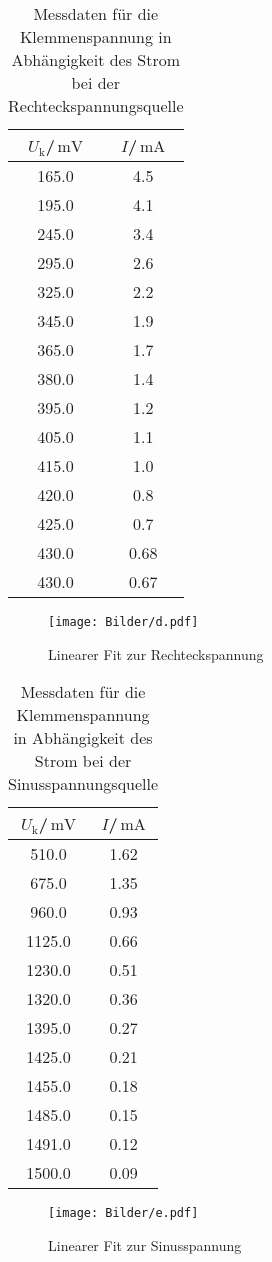 \begin{table}[h]
  \centering
  \caption{Messdaten für die Klemmenspannung in Abhängigkeit des Strom bei der Rechteckspannungsquelle}
  \label{tab:reckteck}
\begin{tabular}{cc}
  \toprule
$U_\text{k}$/$\,\si{\milli\volt}$ & $I$/$\,\si{\milli\ampere}$\\
\midrule
165.0 & 4.5 \\
195.0 & 4.1 \\
245.0 & 3.4 \\
295.0 & 2.6 \\
325.0 & 2.2 \\
345.0 & 1.9 \\
365.0 & 1.7 \\
380.0 & 1.4 \\
395.0 & 1.2 \\
405.0 & 1.1 \\
415.0 & 1.0 \\
420.0 & 0.8 \\
425.0 & 0.7 \\
430.0 & 0.68 \\
430.0 & 0.67 \\
\bottomrule
\end{tabular}
\end{table}
\begin{figure}[h]
\texttt{[image: Bilder/d.pdf]}
\caption{Linearer Fit zur Rechteckspannung}
\label{fig:plot_rechteck}
\end{figure}

\begin{table}[h]
  \centering
  \caption{Messdaten für die Klemmenspannung in Abhängigkeit des Strom bei der Sinusspannungsquelle}
  \label{tab:sinus}

\begin{tabular}{cc}
  \toprule
$U_\text{k}$/$\,\si{\milli\volt}$ & $I$/$\,\si{\milli\ampere}$\\
\midrule
510.0 & 1.62 \\
675.0 & 1.35 \\
960.0 & 0.93 \\
1125.0 & 0.66 \\
1230.0 & 0.51 \\
1320.0 & 0.36 \\
1395.0 & 0.27 \\
1425.0 & 0.21 \\
1455.0 & 0.18 \\
1485.0 & 0.15 \\
1491.0 & 0.12 \\
1500.0 & 0.09 \\
\bottomrule
\end{tabular}
\end{table}
\begin{figure}[h]
\texttt{[image: Bilder/e.pdf]}
\caption{Linearer Fit zur Sinusspannung}
\label{fig:plot_sinus}
\end{figure}
